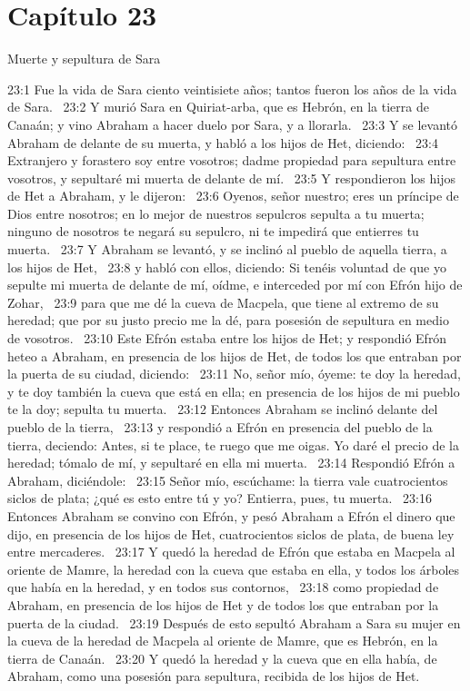\section*{Capítulo 23}
Muerte y sepultura de Sara  

23:1 Fue la vida de Sara ciento veintisiete años; tantos fueron los años de la vida de Sara.  
23:2 Y murió Sara en Quiriat-arba, que es Hebrón, en la tierra de Canaán; y vino Abraham a hacer duelo por Sara, y a llorarla.  
23:3 Y se levantó Abraham de delante de su muerta, y habló a los hijos de Het, diciendo:  
23:4 Extranjero y forastero soy entre vosotros; dadme propiedad para sepultura entre vosotros, y sepultaré mi muerta de delante de mí.  
23:5 Y respondieron los hijos de Het a Abraham, y le dijeron:  
23:6 Oyenos, señor nuestro; eres un príncipe de Dios entre nosotros; en lo mejor de nuestros sepulcros sepulta a tu muerta; ninguno de nosotros te negará su sepulcro, ni te impedirá que entierres tu muerta.  
23:7 Y Abraham se levantó, y se inclinó al pueblo de aquella tierra, a los hijos de Het,  
23:8 y habló con ellos, diciendo: Si tenéis voluntad de que yo sepulte mi muerta de delante de mí, oídme, e interceded por mí con Efrón hijo de Zohar,  
23:9 para que me dé la cueva de Macpela, que tiene al extremo de su heredad; que por su justo precio me la dé, para posesión de sepultura en medio de vosotros.  
23:10 Este Efrón estaba entre los hijos de Het; y respondió Efrón heteo a Abraham, en presencia de los hijos de Het, de todos los que entraban por la puerta de su ciudad, diciendo:  
23:11 No, señor mío, óyeme: te doy la heredad, y te doy también la cueva que está en ella; en presencia de los hijos de mi pueblo te la doy; sepulta tu muerta.  
23:12 Entonces Abraham se inclinó delante del pueblo de la tierra,  
23:13 y respondió a Efrón en presencia del pueblo de la tierra, deciendo: Antes, si te place, te ruego que me oigas. Yo daré el precio de la heredad; tómalo de mí, y sepultaré en ella mi muerta.  
23:14 Respondió Efrón a Abraham, diciéndole:  
23:15 Señor mío, escúchame: la tierra vale cuatrocientos siclos de plata; ¿qué es esto entre tú y yo? Entierra, pues, tu muerta.  
23:16 Entonces Abraham se convino con Efrón, y pesó Abraham a Efrón el dinero que dijo, en presencia de los hijos de Het, cuatrocientos siclos de plata, de buena ley entre mercaderes.  
23:17 Y quedó la heredad de Efrón que estaba en Macpela al oriente de Mamre, la heredad con la cueva que estaba en ella, y todos los árboles que había en la heredad, y en todos sus contornos,  
23:18 como propiedad de Abraham, en presencia de los hijos de Het y de todos los que entraban por la puerta de la ciudad.  
23:19 Después de esto sepultó Abraham a Sara su mujer en la cueva de la heredad de Macpela al oriente de Mamre, que es Hebrón, en la tierra de Canaán.  
23:20 Y quedó la heredad y la cueva que en ella había, de Abraham, como una posesión para sepultura, recibida de los hijos de Het.  
